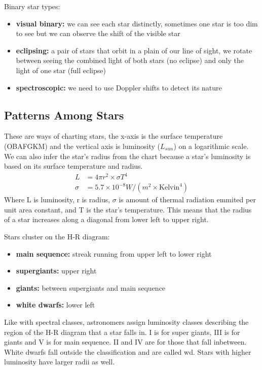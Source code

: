 Binary star types:
\begin{itemize}
\item \textbf{visual binary: } we can see each star distinctly, sometimes one star is too dim to see but we can observe the shift of the visible star
\item \textbf{eclipsing: }  a pair of stars that orbit in a plain of our line of sight, we rotate between seeing the combined light of both stars (no eclipse) and only the light of one star (full eclipse)
\item \textbf{spectroscopic: } we need to use Doppler shifts to detect its nature
\end{itemize}

\subsection{Patterns Among Stars}
These are ways of charting stars, the x-axis is the surface temperature (OBAFGKM) and the vertical axis is luminosity ($L_{sun}$) on a logarithmic scale. We can also infer the star's radius from the chart because a star's luminosity is based on its surface temperature and radius.
\begin{align*}
L &= 4\pi r^2 \times \sigma T^4 \\
\sigma &= 5.7 \times 10^{-8} W/(m^2 \times \text{Kelvin}^4)
\end{align*}
Where L is luminosity, r is radius, $\sigma$ is amount of thermal radiation emmited per unit area constant, and T is the star's temperature. This means that the radius of a star increases along a diagonal from lower left to upper right.

Stars cluster on the H-R diagram:
\begin{itemize}
\item \textbf{main sequence: }streak running from upper left to lower right
\item \textbf{supergiants: }upper right
\item \textbf{giants: }between supergiants and main sequence
\item \textbf{white dwarfs: }lower left
\end{itemize}

Like with spectral classes, astronomers assign luminosity classes describing the region of the H-R diagram that a star falls in. I is for super giants, III is for giants and V is for main sequence. II and IV are for those that fall inbetween. White dwarfs fall outside the classification and are called wd. Stars with higher luminosity have larger radii as well.

